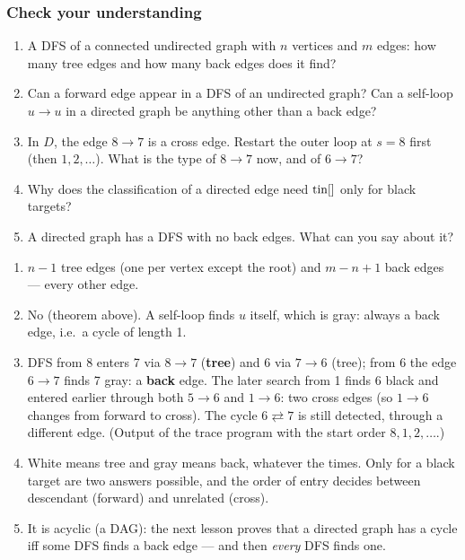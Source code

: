 \subsubsection*{Check your understanding}

\begin{enumerate}[leftmargin=*]
    \item A DFS of a connected undirected graph with $n$ vertices and $m$ edges: how many tree edges and how many back edges does it find?
    \item Can a forward edge appear in a DFS of an undirected graph? Can a self-loop $u \to u$ in a directed graph be anything other than a back edge?
    \item In $D$, the edge $8 \to 7$ is a cross edge. Restart the outer loop at $s = 8$ first (then $1, 2, \dots$). What is the type of $8 \to 7$ now, and of $6 \to 7$?
    \item Why does the classification of a directed edge need $\mathrm{tin}[]$ only for black targets?
    \item A directed graph has a DFS with no back edges. What can you say about it?
\end{enumerate}

\begin{solutionbox}[Answers]
\begin{enumerate}[leftmargin=*]
    \item $n - 1$ tree edges (one per vertex except the root) and $m - n + 1$ back edges --- every other edge.
    \item No (theorem above). A self-loop finds $u$ itself, which is gray: always a back edge, i.e.\ a cycle of length 1.
    \item DFS from 8 enters 7 via $8 \to 7$ (\textbf{tree}) and 6 via $7 \to 6$ (tree); from 6 the edge $6 \to 7$ finds 7 gray: a \textbf{back} edge. The later search from 1 finds 6 black and entered earlier through both $5 \to 6$ and $1 \to 6$: two cross edges (so $1 \to 6$ changes from forward to cross). The cycle $6 \rightleftarrows 7$ is still detected, through a different edge. (Output of the trace program with the start order $8, 1, 2, \dots$.)
    \item White means tree and gray means back, whatever the times. Only for a black target are two answers possible, and the order of entry decides between descendant (forward) and unrelated (cross).
    \item It is acyclic (a DAG): the next lesson proves that a directed graph has a cycle iff some DFS finds a back edge --- and then \emph{every} DFS finds one.
\end{enumerate}
\end{solutionbox}
